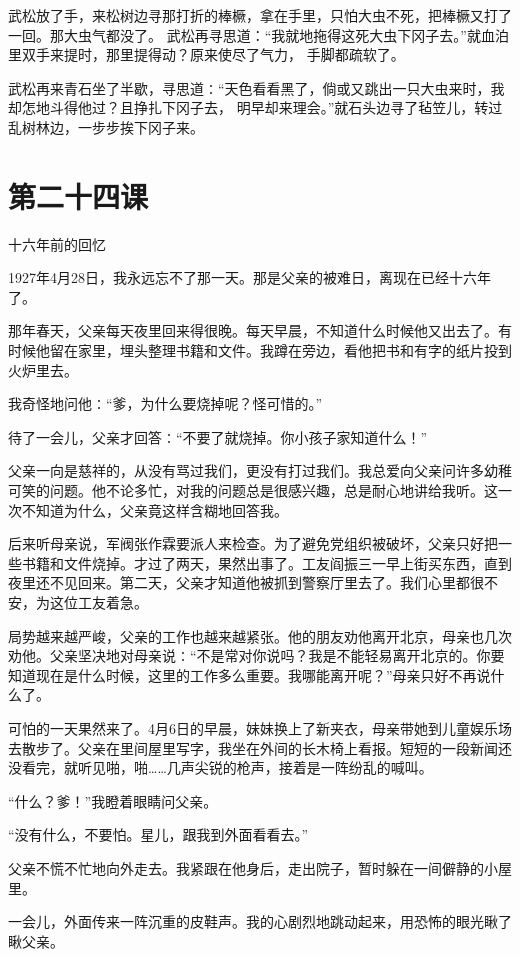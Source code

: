 \documentclass[12pt,UTF8]{ctexbook}
\begin{document}
武松放了手，来松树边寻那打折的棒橛，拿在手里，只怕大虫不死，把棒橛又打了一回。那大虫气都没了。
武松再寻思道：“我就地拖得这死大虫下冈子去。”就血泊里双手来提时，那里提得动？原来使尽了气力，
手脚都疏软了。

武松再来青石坐了半歇，寻思道∶“天色看看黑了，倘或又跳出一只大虫来时，我却怎地斗得他过？且挣扎下冈子去，
明早却来理会。”就石头边寻了毡笠儿，转过乱树林边，一步步挨下冈子来。

\section{第二十四课}

十六年前的回忆

1927年4月28日，我永远忘不了那一天。那是父亲的被难日，离现在已经十六年了。

那年春天，父亲每天夜里回来得很晚。每天早晨，不知道什么时候他又出去了。有时候他留在家里，埋头整理书籍和文件。我蹲在旁边，看他把书和有字的纸片投到火炉里去。

我奇怪地问他∶“爹，为什么要烧掉呢？怪可惜的。”

待了一会儿，父亲才回答∶“不要了就烧掉。你小孩子家知道什么！”

父亲一向是慈祥的，从没有骂过我们，更没有打过我们。我总爱向父亲问许多幼稚可笑的问题。他不论多忙，对我的问题总是很感兴趣，总是耐心地讲给我听。这一次不知道为什么，父亲竟这样含糊地回答我。

后来听母亲说，军阀张作霖要派人来检查。为了避免党组织被破坏，父亲只好把一些书籍和文件烧掉。才过了两天，果然出事了。工友阎振三一早上街买东西，直到夜里还不见回来。第二天，父亲才知道他被抓到警察厅里去了。我们心里都很不安，为这位工友着急。

局势越来越严峻，父亲的工作也越来越紧张。他的朋友劝他离开北京，母亲也几次劝他。父亲坚决地对母亲说∶“不是常对你说吗？我是不能轻易离开北京的。你要知道现在是什么时候，这里的工作多么重要。我哪能离开呢？”母亲只好不再说什么了。

可怕的一天果然来了。4月6日的早晨，妹妹换上了新夹衣，母亲带她到儿童娱乐场去散步了。父亲在里间屋里写字，我坐在外间的长木椅上看报。短短的一段新闻还没看完，就听见啪，啪……几声尖锐的枪声，接着是一阵纷乱的喊叫。

“什么？爹！”我瞪着眼睛问父亲。

“没有什么，不要怕。星儿，跟我到外面看看去。”

父亲不慌不忙地向外走去。我紧跟在他身后，走出院子，暂时躲在一间僻静的小屋里。

一会儿，外面传来一阵沉重的皮鞋声。我的心剧烈地跳动起来，用恐怖的眼光瞅了瞅父亲。
\end{document}
